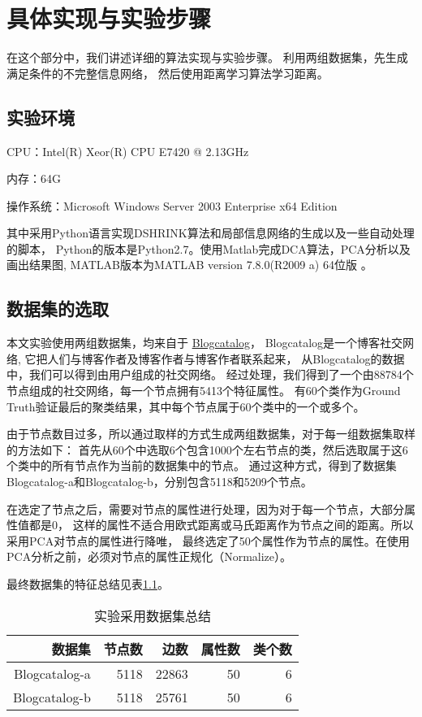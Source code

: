 \chapter{具体实现与实验步骤}
\label{chap:implementation}

在这个部分中，我们讲述详细的算法实现与实验步骤。
利用两组数据集，先生成满足条件的不完整信息网络，
然后使用距离学习算法学习距离。

\section{实验环境}

CPU：Intel(R) Xeor(R) CPU E7420 @ 2.13GHz

内存：64G

操作系统：Microsoft Windows Server 2003 Enterprise x64 Edition

其中采用Python语言实现DSHRINK算法和局部信息网络的生成以及一些自动处理的脚本，
Python的版本是Python2.7。使用Matlab完成DCA算法，PCA分析以及画出结果图,
MATLAB版本为MATLAB version 7.8.0(R2009 a) 64位版 。

\section{数据集的选取}
\label{sec:imple:dataset}

本文实验使用两组数据集，均来自于
\href{http://www.blogcatalog.com/}{Blogcatalog}，
Blogcatalog是一个博客社交网络, 它把人们与博客作者及博客作者与博客作者联系起来，
从Blogcatalog的数据中，我们可以得到由用户组成的社交网络。
经过处理，我们得到了一个由88784个节点组成的社交网络，每一个节点拥有5413个特征属性。
有60个类作为Ground Truth验证最后的聚类结果，其中每个节点属于60个类中的一个或多个。

由于节点数目过多，所以通过取样的方式生成两组数据集，对于每一组数据集取样的方法如下：
首先从60个中选取6个包含1000个左右节点的类，然后选取属于这6个类中的所有节点作为当前的数据集中的节点。
通过这种方式，得到了数据集Blogcatalog-a和Blogcatalog-b，分别包含5118和5209个节点。

在选定了节点之后，需要对节点的属性进行处理，因为对于每一个节点，大部分属性值都是0，
这样的属性不适合用欧式距离或马氏距离作为节点之间的距离。所以采用PCA对节点的属性进行降唯，
最终选定了50个属性作为节点的属性。在使用PCA分析之前，必须对节点的属性正规化（Normalize）。

最终数据集的特征总结见表\ref{tab:datasetsummary}。

\begin{table}[!hpb]
  \centering
  \caption{实验采用数据集总结}
  \label{tab:datasetsummary}
  \begin{tabular}{rrrrr} \toprule
    数据集 & 节点数 & 边数  & 属性数 & 类个数\\ \midrule
    Blogcatalog-a & 5118 & 22863 & 50 & 6 \\
    Blogcatalog-b & 5118 & 25761  & 50 & 6 \\ \bottomrule
  \end{tabular}
\end{table}



